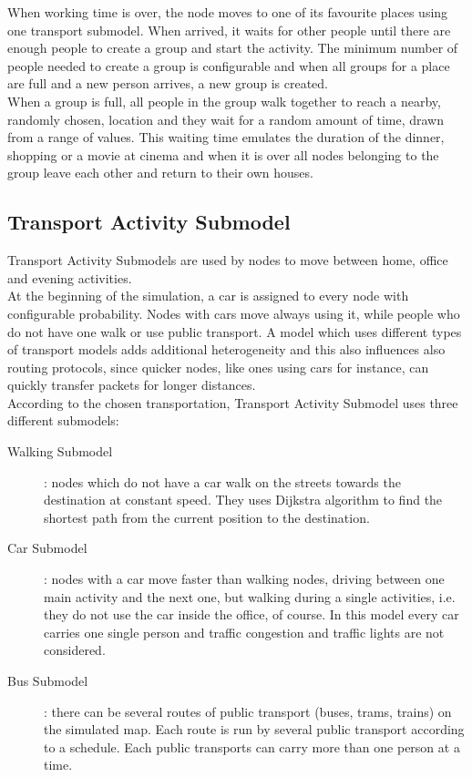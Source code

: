 When working time is over, the node moves to one of its favourite places using one transport submodel. When arrived, it waits for other people until there are enough people to create a group and start the activity. The minimum number of people needed to create a group is configurable and when all groups for a place are full and a new person arrives, a new group is created.
\\

When a group is full, all people in the group walk together to reach a nearby, randomly chosen, location and they wait for a random amount of time, drawn from a range of values. This waiting time emulates the duration of the dinner, shopping or a movie at cinema and when it is over all nodes belonging to the group leave each other and return to their own houses.

\subsection{Transport Activity Submodel}
Transport Activity Submodels are used by nodes to move between home, office and evening activities.
\\

At the beginning of the simulation, a car is assigned to every node with configurable probability. Nodes with cars move always using it, while people who do not have one walk or use public transport. A model which uses different types of transport models adds additional heterogeneity and this also influences also routing protocols, since quicker nodes, like ones using cars for instance, can quickly transfer packets for longer distances.
\\

According to the chosen transportation, Transport Activity Submodel uses three different submodels:
\\

\begin{description}
\item [Walking Submodel]: nodes which do not have a car walk on the streets towards the destination at constant speed. They uses Dijkstra algorithm to find the shortest path from the current position to the destination.

\item [Car Submodel]: nodes with a car move faster than walking nodes, driving between one main activity and the next one, but walking during a single activities, i.e. they do not use the car inside the office, of course. In this model every car carries one single person and traffic congestion and traffic lights are not considered.

\item [Bus Submodel]: there can be several routes of public transport (buses, trams, trains) on the simulated map. Each route is run by several public transport according to a schedule. Each public transports can carry more than one person at a time.
\end{description}

